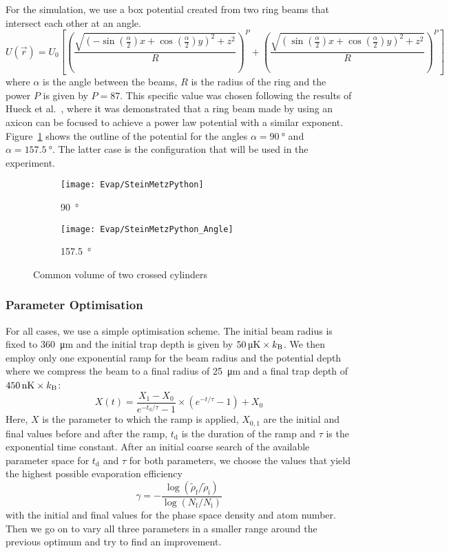 For the simulation, we use a box potential created from two ring beams that intersect each other at an angle. 
\begin{equation*}
    U(\vec{r}) = U_0 \left[ \left( \frac{\sqrt{(-\sin(\frac{\alpha}{2})x + \cos(\frac{\alpha}{2})y)^2 + z^2}}{R} \right) ^ P + \left( \frac{\sqrt{(\sin(\frac{\alpha}{2})x + \cos(\frac{\alpha}{2})y)^2 + z^2}}{R} \right) ^ P \right]
\end{equation*}
where $\alpha$ is the angle between the beams, $R$ is the radius of the ring and the power $P$ is given by $P = \num{87}$. This specific value was chosen following the results of Hueck et al.~\cite{PhysRevLett.120.060402}, where it was demonstrated that a ring beam made by using an axicon can be focused to achieve a power law potential with a similar exponent. 
Figure~\ref{fig:steinmetz_solid} shows the outline of the potential for the angles $\alpha=\SI{90}{\degree}$ and $\alpha=\SI{157.5}{\degree}$. The latter case is the configuration that will be used in the experiment.
\begin{figure}[htbp]
    \centering
    \begin{subfigure}[b]{.49\textwidth}
        \centering
        \texttt{[image: Evap/SteinMetzPython]}
        \caption{\SI{90}{\degree}}
    \end{subfigure}
    \begin{subfigure}[b]{.49\textwidth}
        \centering
        \texttt{[image: Evap/SteinMetzPython\_Angle]}
        \caption{\SI{157.5}{\degree}}
    \end{subfigure}
    \caption{Common volume of two crossed cylinders}
    \label{fig:steinmetz_solid}
\end{figure}

\subsubsection*{Parameter Optimisation}
For all cases, we use a simple optimisation scheme. 
The initial beam radius is fixed to \SI{360}{\micro\meter} and the initial trap depth is given by $\SI{50}{\micro\kelvin}\times k_\text{B}$. We then employ only one exponential ramp for the beam radius and the potential depth where we compress the beam to a final radius of \SI{25}{\micro\meter} and a final trap depth of $\SI{450}{\nano\kelvin}\times k_\text{B}$:
\begin{equation*}
    X(t) = \frac{X_1 - X_0}{e^{-t_\text{d}/\tau} - 1} \times \left(e^{-t/\tau} - 1\right) + X_0
\end{equation*}
Here, $X$ is the parameter to which the ramp is applied, $X_{0,1}$ are the initial and final values before and after the ramp, $t_\text{d}$ is the duration of the ramp and $\tau$ is the exponential time constant.
After an initial coarse search of the available parameter space for $t_\text{d}$ and $\tau$ for both parameters, we choose the values that yield the highest possible evaporation efficiency
\[
    \gamma = -\frac{\log(\tilde{\rho}_\text{f}/\tilde{\rho}_\text{i})}{\log(N_\text{f}/N_\text{i})}
\]
with the initial and final values for the phase space density and atom number. Then we go on to vary all three parameters in a smaller range around the previous optimum and try to find an improvement. 

